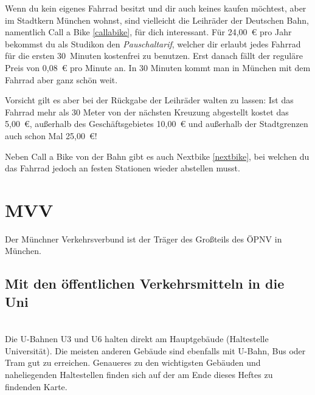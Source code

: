 Wenn du kein eigenes Fahrrad besitzt und dir auch keines kaufen möchtest, aber im
Stadtkern München wohnst, sind vielleicht die Leihräder der Deutschen Bahn,
namentlich Call a Bike \ref{callabike}, für dich interessant. Für 24,00~€ pro
Jahr bekommst du als Studikon den \emph{Pauschaltarif}, welcher dir erlaubt jedes
Fahrrad für die ersten 30~Minuten kostenfrei zu benutzen. Erst danach fällt der
reguläre Preis von 0,08~€ pro Minute an. In 30 Minuten kommt man in München mit dem Fahrrad
aber ganz schön weit.

Vorsicht gilt es aber bei der Rückgabe der Leihräder walten zu lassen: Ist das
Fahrrad mehr als 30 Meter von der nächsten Kreuzung abgestellt kostet das
5,00~€, außerhalb des Geschäftsgebietes 10,00~€ und außerhalb der Stadtgrenzen
auch schon Mal 25,00~€!

Neben Call a Bike von der Bahn gibt es auch Nextbike \ref{nextbike}, bei
welchen du das Fahrrad jedoch an festen Stationen wieder abstellen musst.

\begin{urlList}
\end{urlList}



\section{MVV}
Der Münchner Verkehrsverbund ist der Träger des Großteils des ÖPNV in München.

\subsection*{Mit den öffentlichen Verkehrsmitteln in die Uni}\hfill\\
Die U-Bahnen U3 und U6 halten direkt am Hauptgebäude (Haltestelle Universität).
Die meisten anderen Gebäude sind ebenfalls mit U-Bahn, Bus oder Tram gut zu
erreichen. Genaueres zu den wichtigsten Gebäuden und naheliegenden Haltestellen
finden sich auf der am Ende dieses Heftes zu findenden Karte.

